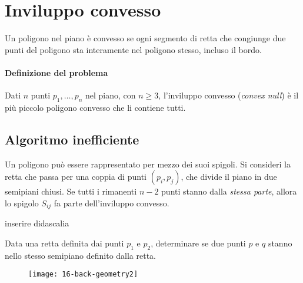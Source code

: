 \newpage
\section{Inviluppo convesso}

\begin{definition}
Un poligono nel piano è \alert{convesso} se ogni segmento di retta che congiunge due punti del poligono sta interamente nel poligono stesso, incluso il bordo.
\end{definition}

\paragraph{Definizione del problema}
Dati \(n\) punti \(p_1, \dots, p_n\) nel piano, con \(n \geqslant 3\), l'\alert{inviluppo convesso} (\emph{convex null}) è il più piccolo poligono convesso che li contiene tutti.

\subsection{Algoritmo inefficiente}

Un poligono può essere rappresentato per mezzo dei suoi spigoli.
Si consideri la retta che passa per una coppia di punti \((p_i, p_j)\), che divide il piano in due semipiani chiusi.
Se tutti i rimanenti \(n-2\) punti stanno dalla \emph{stessa parte}, allora lo spigolo \(S_{ij}\) fa parte dell'inviluppo convesso.

\NoCaptionOfAlgo
\begin{algorithm}[H]
\caption[]{inserire didascalia}

Data una retta definita dai punti \(p_1\) e \(p_2\), determinare se due punti \(p\) e \(q\) stanno nello stesso semipiano definito dalla retta.

\begin{figure}[H]
	\centering
	\texttt{[image: 16-back-geometry2]}
\end{figure}


\end{algorithm}

